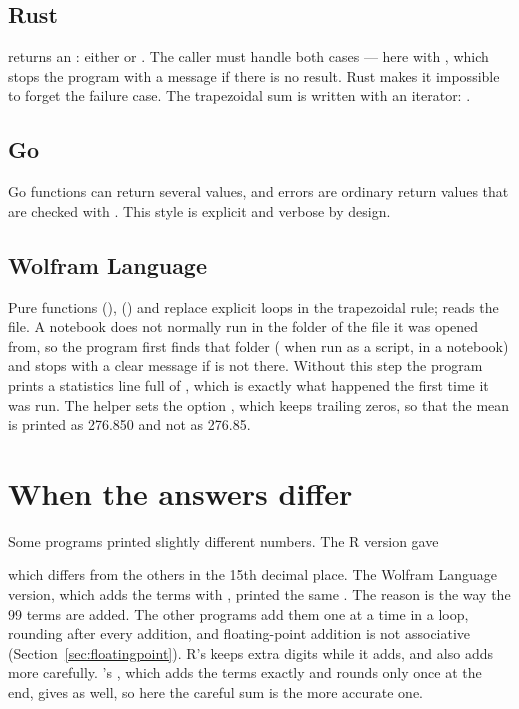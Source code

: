 \subsection*{Rust}
 returns an : either  or
. The caller must handle both cases --- here with , which stops the
program with a message if there is no result. Rust makes it impossible to forget the
failure case. The trapezoidal sum is written with an iterator: .

\subsection*{Go}
Go functions can return several values, and errors are ordinary return values that are
checked with . This style is explicit and verbose by design.

\subsection*{Wolfram Language}
Pure functions (),  () and 
replace explicit loops in the trapezoidal rule;  reads the file. A notebook
does not normally run in the folder of the file it was opened from, so the program first
finds that folder ( when run as a script, 
in a notebook) and stops with a clear message if  is not there. Without
this step the program prints a statistics line full of , which is exactly
what happened the first time it was run. The helper  sets the option
, which keeps trailing zeros, so that the mean is printed as 276.850 and not
as 276.85.

\section{When the answers differ}
\label{sec:rosetta-diff}

Some programs printed slightly different numbers. The R version gave

which differs from the others in the 15th decimal place. The Wolfram Language version,
which adds the terms with , printed the same . The reason is the
way the 99 terms are added. The other programs add them one at a time in a loop, rounding
after every addition, and floating-point addition is not associative
(Section~\ref{sec:floatingpoint}). R's  keeps extra digits while it adds, and
 also adds more carefully. \py's , which adds the terms exactly
and rounds only once at the end, gives  as well, so here the careful sum is
the more accurate one.

